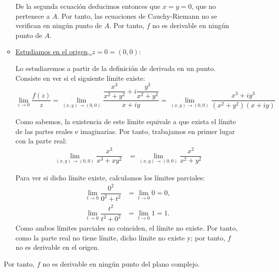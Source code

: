 \begin{ejercicio}
\begin{enumerate}
\begin{itemize}
            De la segunda ecuación deducimos entonces que $x=y=0$, que no pertenece a $A$. Por tanto, las ecuaciones de Cauchy-Riemann no se verifican en ningún punto de $A$. Por tanto, $f$ no es derivable en ningún punto de $A$.

            \item \ul{Estudiamos en el origen, $z=0=(0,0)$}:
            
            Lo estudiaremos a partir de la definición de derivada en un punto. Consiste en ver si el siguiente límite existe:
            \begin{equation*}
                \lim_{z\to 0}\dfrac{f(z)}{z} = \lim_{(x,y)\to (0,0)}\dfrac{\dfrac{x^3}{x^2+y^2}+i\dfrac{y^3}{x^2+y^2}}{x+iy} = \lim_{(x,y)\to (0,0)}\dfrac{x^3+iy^3}{(x^2+y^2)(x+iy)}
            \end{equation*}

            Como sabemos, la existencia de este límite equivale a que exista el límite de las partes reales e imaginarias. Por tanto, trabajamos en primer lugar con la parte real:
            \begin{align*}
                \lim_{(x,y)\to (0,0)}\dfrac{x^3}{x^3+xy^2}
                &= \lim_{(x,y)\to (0,0)}\dfrac{x^2}{x^2+y^2} 
            \end{align*}

            Para ver si dicho límite existe, calculamos los límites parciales:
            \begin{align*}
                \lim_{t\to 0} \dfrac{0^2}{0^2+t^2} &= \lim_{t\to 0} 0 = 0,\\
                \lim_{t\to 0} \dfrac{t^2}{t^2+0^2} &= \lim_{t\to 0} 1 = 1.
            \end{align*}
            Como ambos límites parciales no coinciden, el límite no existe. Por tanto, como la parte real no tiene límite, dicho límite no existe y; por tanto, $f$ no es derivable en el origen.
        \end{itemize}

        Por tanto, $f$ no es derivable en ningún punto del plano complejo.
    \end{enumerate}
\end{ejercicio}

